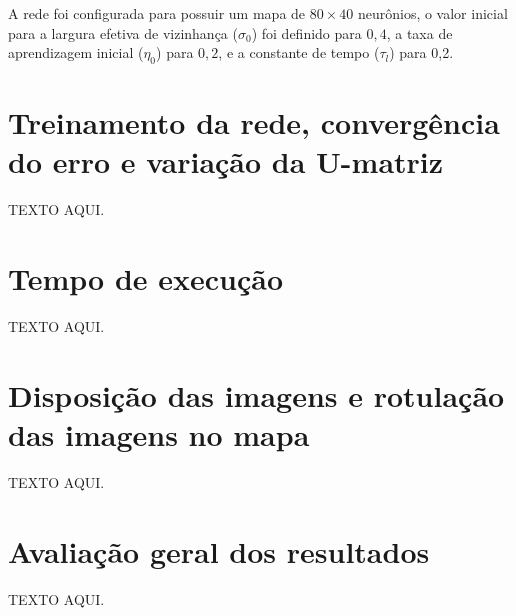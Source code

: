 A rede foi configurada para possuir um mapa de $ 80\times40 $ neurônios, o valor inicial
para a largura efetiva de vizinhança ($ \sigma_0 $) foi definido para $ 0,4 $, a taxa de
aprendizagem inicial ($ \eta_0 $) para $ 0,2 $, e a constante de tempo ($ \tau_l $) para 0,2.

\section{Treinamento da rede, convergência do erro e variação da U-matriz}

TEXTO AQUI.

\section{Tempo de execução}

TEXTO AQUI.

\section{Disposição das imagens e rotulação das imagens no mapa}

TEXTO AQUI.

\section{Avaliação geral dos resultados}

TEXTO AQUI.
